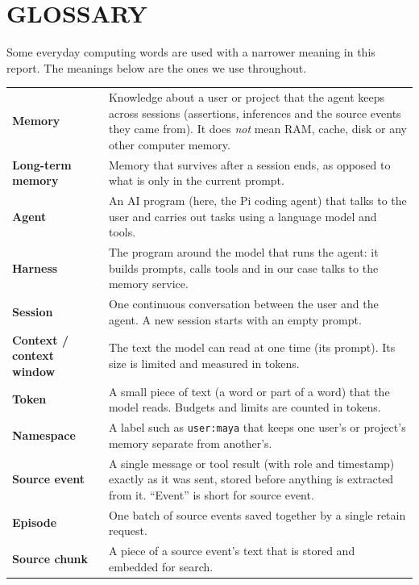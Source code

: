 \chapter*{GLOSSARY}

Some everyday computing words are used with a narrower meaning in this report.
The meanings below are the ones we use throughout.

\setlongtables
\begin{longtable}
  {>{\PBS\raggedright\hspace{0pt}\bfseries}p{3.6cm}@{}%
    >{\PBS\raggedright\hspace{0pt}}p{10.6cm}@{}}
  Memory        & Knowledge about a user or project that the agent keeps across sessions (assertions, inferences and the source events they came from). It does \emph{not} mean RAM, cache, disk or any other computer memory. \\
  Long-term memory & Memory that survives after a session ends, as opposed to what is only in the current prompt. \\
  Agent         & An AI program (here, the Pi coding agent) that talks to the user and carries out tasks using a language model and tools. \\
  Harness       & The program around the model that runs the agent: it builds prompts, calls tools and in our case talks to the memory service. \\
  Session       & One continuous conversation between the user and the agent. A new session starts with an empty prompt. \\
  Context / context window & The text the model can read at one time (its prompt). Its size is limited and measured in tokens. \\
  Token         & A small piece of text (a word or part of a word) that the model reads. Budgets and limits are counted in tokens. \\
  Namespace     & A label such as \texttt{user:maya} that keeps one user's or project's memory separate from another's. \\
  Source event  & A single message or tool result (with role and timestamp) exactly as it was sent, stored before anything is extracted from it. ``Event'' is short for source event. \\
  Episode       & One batch of source events saved together by a single retain request. \\
  Source chunk  & A piece of a source event's text that is stored and embedded for search. \\

\end{longtable}
